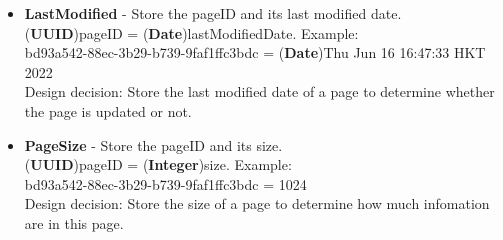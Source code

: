 \documentclass{article}
\begin{document}
\begin{itemize}
        \item \textbf{LastModified} - Store the pageID and its last modified date. \\[0.4em]
        (\textbf{UUID})pageID = (\textbf{Date})lastModifiedDate. Example:\\[0.4em]
        bd93a542-88ec-3b29-b739-9faf1ffc3bdc = (\textbf{Date})Thu Jun 16 16:47:33 HKT 2022\\[0.4em]
        Design decision: Store the last modified date of a page to determine whether the page is updated or not.
        
        \item \textbf{PageSize} - Store the pageID and its size. \\[0.4em]
        (\textbf{UUID})pageID = (\textbf{Integer})size. Example:\\[0.4em]
        bd93a542-88ec-3b29-b739-9faf1ffc3bdc = 1024\\[0.4em]
        Design decision: Store the size of a page to determine how much infomation are in this page.
    \end{itemize}
\end{document}
